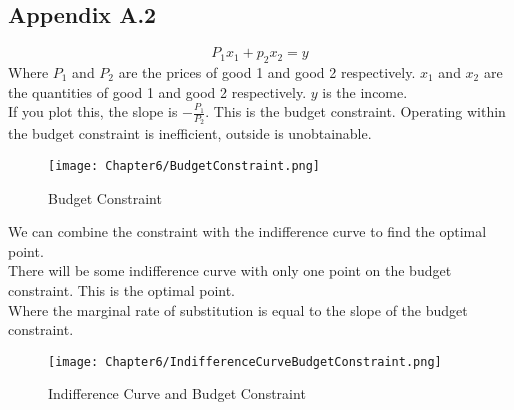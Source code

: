 \subsection*{Appendix A.2}
\begin{equation}
    P_1x_1+p_2x_2 = y
\end{equation}
Where $P_1$ and $P_2$ are the prices of good 1 and good 2 respectively. $x_1$ and $x_2$ are the quantities of good 1 and good 2 respectively. $y$ is the income.\\
If you plot this, the slope is $-\frac{P_1}{P_2}$. This is the budget constraint. Operating within the budget constraint is inefficient, outside is unobtainable. 
\begin{figure}[H]
    \centering
    \texttt{[image: Chapter6/BudgetConstraint.png]}
    \caption{Budget Constraint}
    \label{fig:Budget_Constraint}
\end{figure}
We can combine the constraint with the indifference curve to find the optimal point.\\
There will be some indifference curve with only one point on the budget constraint. This is the optimal point.\\
Where the marginal rate of substitution is equal to the slope of the budget constraint.
\begin{figure}[H]
    \centering
    \texttt{[image: Chapter6/IndifferenceCurveBudgetConstraint.png]}
    \caption{Indifference Curve and Budget Constraint}
    \label{fig:Indifference_Curve_Budget_Constraint}
\end{figure}